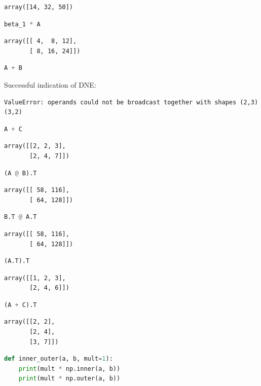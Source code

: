 \documentclass[11pt,letterpaper]{article}
\begin{document}
\begin{enumerate}
\begin{enumerate}
\begin{verbatim}
array([14, 32, 50])
\end{verbatim}
\begin{lstlisting}[language=python]
beta_1 * A
\end{lstlisting}
\begin{verbatim}
array([[ 4,  8, 12],
       [ 8, 16, 24]])
\end{verbatim}
\begin{lstlisting}[language=python]
A + B
\end{lstlisting}
Successful indication of DNE:
\begin{verbatim}
ValueError: operands could not be broadcast together with shapes (2,3) (3,2)
\end{verbatim}
\begin{lstlisting}[language=python]
A + C
\end{lstlisting}
\begin{verbatim}
array([[2, 2, 3],
       [2, 4, 7]])
\end{verbatim}
\begin{lstlisting}[language=python]
(A @ B).T
\end{lstlisting}
\begin{verbatim}
array([[ 58, 116],  
       [ 64, 128]])
\end{verbatim}
\begin{lstlisting}[language=python]
B.T @ A.T
\end{lstlisting}
\begin{verbatim}
array([[ 58, 116],
       [ 64, 128]])
\end{verbatim}
\begin{lstlisting}[language=python]
(A.T).T
\end{lstlisting}
\begin{verbatim}
array([[1, 2, 3],
       [2, 4, 6]])
\end{verbatim}
\begin{lstlisting}[language=python]
(A + C).T
\end{lstlisting}
\begin{verbatim}
array([[2, 2],
       [2, 4],
       [3, 7]])
\end{verbatim}
\begin{lstlisting}[language=python]
def inner_outer(a, b, mult=1):
    print(mult * np.inner(a, b))
    print(mult * np.outer(a, b))


\end{lstlisting}
\end{enumerate}
\end{enumerate}
\end{document}
